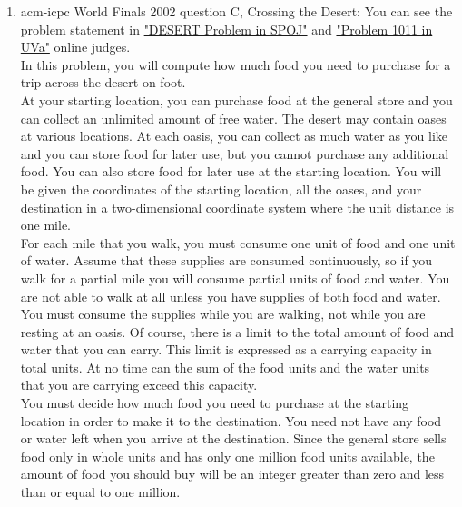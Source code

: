 \documentclass{book}
\begin{document}
\begin{enumerate}
\begin{enumerate}
\begin{enumerate}
\begin{itemize}
			\end{itemize}
		\end{enumerate}		
		\item acm-icpc World Finals 2002 question C, Crossing the Desert: You can see the problem statement in \href{http://www.spoj.com/problems/DESERT/}{"DESERT Problem in SPOJ"} and \href{https://uva.onlinejudge.org/index.php?option=com_onlinejudge&Itemid=8&page=show_problem&problem=3452}{"Problem 1011 in UVa"} online judges.\\
		In this problem, you will compute how much food you need to purchase for a trip across the desert on foot.\\
		At your starting location, you can purchase food at the general store and you can collect an unlimited amount of free water. The desert may contain oases at various locations. At each oasis, you can collect as much water as you like and you can store food for later use, but you cannot purchase any additional food. You can also store food for later use at the starting location. You will be given the coordinates of the starting location, all the oases, and your destination in a two-dimensional coordinate system where the unit distance is one mile. \\
		For each mile that you walk, you must consume one unit of food and one unit of water. Assume that these supplies are consumed continuously, so if you walk for a partial mile you will consume partial units of food and water. You are not able to walk at all unless you have supplies of both food and water. You must consume the supplies while you are walking, not while you are resting at an oasis. Of course, there is a limit to the total amount of food and water that you can carry. This limit is expressed as a carrying capacity in total units. At no time can the sum of the food units and the water units that you are carrying exceed this capacity. \\
		You must decide how much food you need to purchase at the starting location in order to make it to the destination. You need not have any food or water left when you arrive at the destination. Since the general store sells food only in whole units and has only one million food units available, the amount of food you should buy will be an integer greater than zero and less than or equal to one million. 

\end{enumerate}
\end{enumerate}
\end{document}
